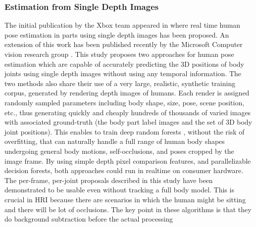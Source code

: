 \subsubsection{Estimation from Single Depth Images}
 The initial publication by the Xbox \cite{Kinect2014} team appeared in \cite{shotton2013real} where real time human pose estimation in parts using single depth images has been proposed. An extension of this work has been published recently by the Microsoft Computer vision research group \cite{shotton2013efficient}. This study proposes two approaches for human pose estimation which are capable of accurately predicting the 3D positions of body joints using single depth images without using any temporal information. The two methods also share their use of a very large, realistic, synthetic training corpus, generated by rendering depth images of humans. Each render is assigned randomly sampled parameters including body shape, size, pose, scene position, etc., thus generating quickly and cheaply hundreds of thousands of varied images with associated ground-truth (the body part label images and the set of 3D body joint positions). This enables to train deep random forests \cite{breiman2001random}, without the risk of overfitting, that can naturally handle a full range of human body shapes undergoing general body motions, self-occlusions, and poses cropped by the image frame. By using simple depth pixel comparison features, and parallelizable decision forests, both approaches could run in realtime on consumer hardware. The per-frame, per-joint proposals described in this study have been demonstrated to be usable even without tracking a full body model. This is crucial in HRI because there are scenarios in which the human might be sitting and there will be lot of occlusions. The key point in these algorithms is that they do background subtraction before the actual processing 
